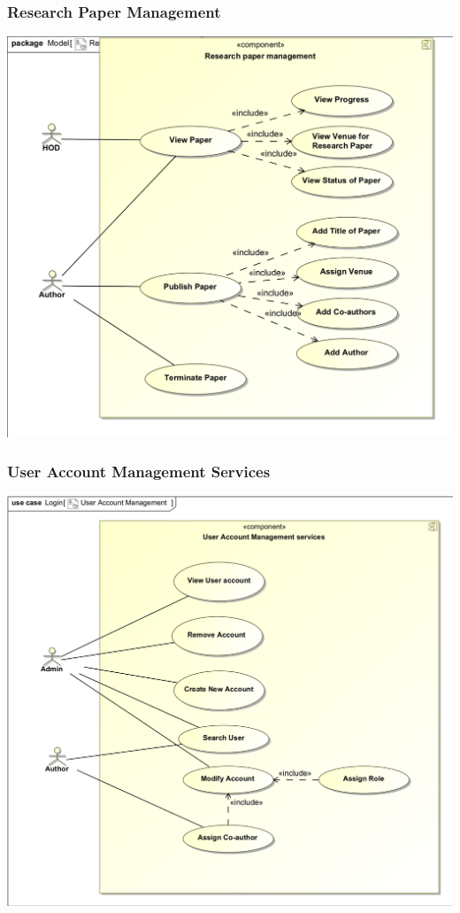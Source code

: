 \documentclass[11pt]{article}
\begin{document}
	\subsubsection{Research Paper Management}
	\begin{center}
		\includegraphics[width=\textwidth]{../Images/ResearchPaperManagement_UseCase.png}\\[0.5cm]
	\end{center}
	\subsubsection{User Account Management Services}
	\begin{center}
		\includegraphics[width=\textwidth]{../Images/UserAccountManagementServices_UseCase.png}\\[0.5cm]
	\end{center}
\end{document}
